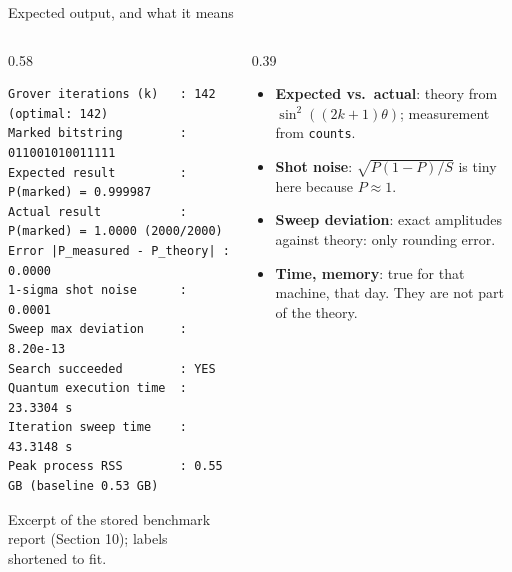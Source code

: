 \documentclass[aspectratio=169,11pt]{beamer}
\newcommand{\key}[1]{{\color{qdark}\textbf{#1}}}
\begin{document}
\begin{frame}[fragile]{Expected output, and what it means}
  \begin{columns}[T]
    \begin{column}{0.58\textwidth}
\begin{lstlisting}[language={},basicstyle=\ttfamily\scriptsize]
Grover iterations (k)   : 142 (optimal: 142)
Marked bitstring        : 011001010011111
Expected result         : P(marked) = 0.999987
Actual result           : P(marked) = 1.0000 (2000/2000)
Error |P_measured - P_theory| : 0.0000
1-sigma shot noise      : 0.0001
Sweep max deviation     : 8.20e-13
Search succeeded        : YES
Quantum execution time  : 23.3304 s
Iteration sweep time    : 43.3148 s
Peak process RSS        : 0.55 GB (baseline 0.53 GB)
\end{lstlisting}
      \small Excerpt of the stored benchmark report (Section 10); labels shortened to fit.
    \end{column}
    \begin{column}{0.39\textwidth}
      \small
      \begin{itemize}
        \item \key{Expected vs.\ actual}: theory from $\sin^2((2k+1)\theta)$; measurement from \texttt{counts}.
        \item \key{Shot noise}: $\sqrt{P(1-P)/S}$ is tiny here because $P \approx 1$.
        \item \key{Sweep deviation}: exact amplitudes against theory: only rounding error.
        \item \key{Time, memory}: true for that machine, that day. They are not part of the theory.
      \end{itemize}
    \end{column}
  \end{columns}
\end{frame}
\end{document}

